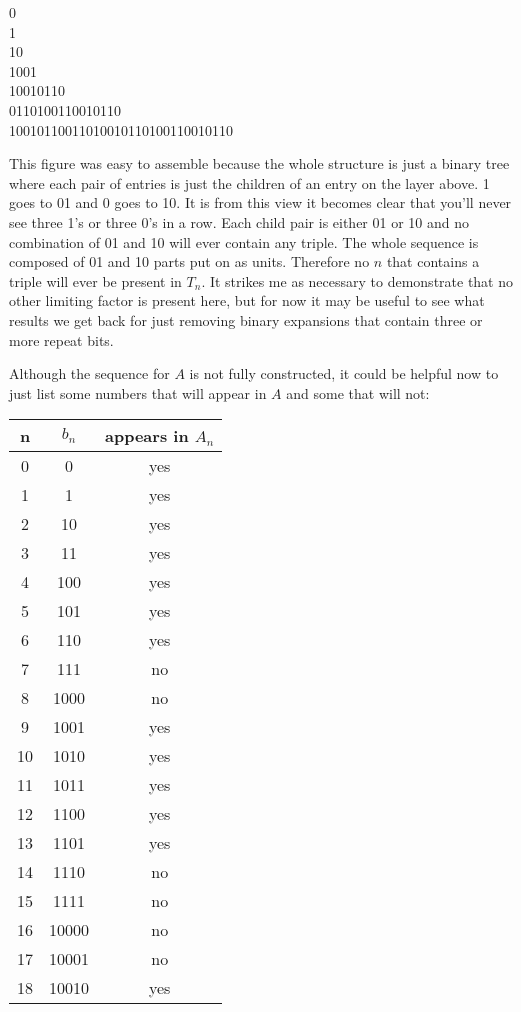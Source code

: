 \documentclass{article}
\begin{document}
\begin{center}
    0 \\
    1 \\
    10 \\
    1001 \\
    10010110 \\
    0110100110010110 \\
    10010110011010010110100110010110 \\
\end{center}

This figure was easy to assemble because the whole structure is just a binary tree where each pair of entries is just the children of an entry on the layer above.  1 goes to 01 and 0 goes to 10.  It is from this view it becomes clear that you'll never see three 1's or three 0's in a row.  Each child pair is either 01 or 10 and no combination of 01 and 10 will ever contain any triple.  The whole sequence is composed of 01 and 10 parts put on as units.  Therefore no $n$ that contains a triple will ever be present in $T_n$.  It strikes me as necessary to demonstrate that no other limiting factor is present here, but for now it may be useful to see what results we get back for just removing binary expansions that contain three or more repeat bits.

\par

Although the sequence for $A$ is not fully constructed, it could be helpful now to just list some numbers that will appear in $A$ and some that will not:

\begin{center}
    \begin{tabular}{c | c | c}
        n & $b_{n}$ & appears in $A_n$ \\
        \hline
        0 & 0 & yes \\
        1 & 1 & yes \\
        2 & 10 & yes \\
        3 & 11 & yes \\
        4 & 100 & yes \\
        5 & 101 & yes \\
        6 & 110 & yes \\
        7 & 111 & no \\
        8 & 1000 & no \\
        9 & 1001 & yes \\
        10 & 1010 & yes \\
        11 & 1011 & yes \\
        12 & 1100 & yes \\
        13 & 1101 & yes \\
        14 & 1110 & no \\
        15 & 1111 & no \\
        16 & 10000 & no \\
        17 & 10001 & no \\
        18 & 10010 & yes \\
    \end{tabular}
\end{center}
\end{document}
